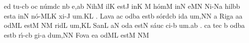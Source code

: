\sgn {}e{}\punctum d\egn
\spatium
\sgn t{u}{-}\clivis cb\egn
\sgn {}o{}\punctum c\egn
\spatium
\sgn n{\'u}m\clivis dc\egn
{}n\punctum b\egn
\sgn {}e,\punctum a\augmentum b\egn
\spatium
\divisiominor
\spatium
\sgn N{i}h\punctum M\egn
\sgn {}il\punctum K\egn
\spatium
\sgn est\punctum J\egn
\spatium
\sgn {}in\punctum K\egn
\spatium
\custos M
\lineaproxima
\sgn h{\'o}m\punctum M\egn
\sgn {}in\punctum N\egn
\sgn {}e{}\punctum M\augmentum N\egn
\spatium
\divisiominor
\spatium
\sgn N{i}{-}\pes Na\egn
\sgn hil\bmolle b\punctum b\egn
\spatium
\sgn est\punctum a\egn
\spatium
\sgn {}in\punctum N\egn
\sgn n{\'o}{-}\climacus MLK\egn
\sgn xi{-}\punctum J\egn
\sgn {}u{m.}\punctum K\augmentum L\egn
\spatium
\divisiofinalis
{}.{}\egn
\spatium
\sgn L{a}v\punctum a\egn
\sgn {}a{}\punctum c\egn
\spatium
{}od\clivis ba\egn
\spatium
\sgn est\punctum b\egn
\spatium
\sgn s{\'o}{rd}\clivis cb\egn
\sgn {}id\punctum a\egn
\sgn {}u{m,}\punctum N\augmentum N\egn
\spatium
\divisiominor
\spatium
\custos a
\lineaproxima
\sgn R{i}g\engl{}\punctum a\egn
\sgn {}a{}\punctum a\egn
\spatium
{}od\clivis ML\egn
\spatium
\sgn est\punctum M\egn
\spatium
{}\clivis NM\egn
\sgn rid\punctum L\egn
\sgn {}u{m,}\punctum K\augmentum L\egn
\spatium
\divisiominor
\spatium
\sgn S{a}n\punctum L\egn
\sgn {}a{}\punctum N\egn
\spatium
{}od\punctum a\egn
\spatium
\sgn {}e{st}\punctum N\egn
\spatium
\sgn s{\'a}u\punctum c\egn
\sgn ci{-}\punctum b\egn
\sgn {}u{m.}\punctum a\augmentum b\egn
\spatium
\divisiofinalis
{}.{}\egn
\spatium
c\punctum a\egn
\sgn te{}\punctum c\egn
\spatium
\custos b
\lineaproxima
{}od\clivis ba\egn
\spatium
\sgn {}e{st}\punctum b\egn
\spatium
\sgn r{\'\i}{-}\clivis cb\egn
\sgn gi{-}\punctum a\egn
\sgn du{m,}\punctum N\augmentum N\egn
\spatium
\divisiominor
\spatium
\sgn F{o}v\punctum a\egn
\sgn {}e{}\punctum a\egn
\spatium
{}od\clivis ML\egn
\spatium
\sgn est\punctum M\egn
\spatium
{}\clivis NM\egn
